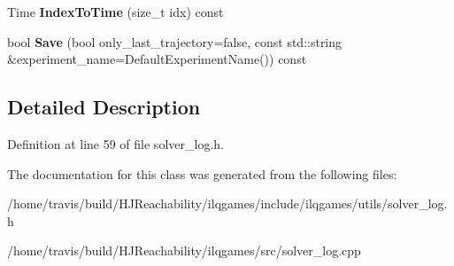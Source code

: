 \begin{DoxyCompactItemize}
\item 
Time {\bfseries Index\+To\+Time} (size\+\_\+t idx) const \hypertarget{classilqgames_1_1_solver_log_a5ab947d807b26ae2f10663e34af24f23}{}\label{classilqgames_1_1_solver_log_a5ab947d807b26ae2f10663e34af24f23}

\item 
bool {\bfseries Save} (bool only\+\_\+last\+\_\+trajectory=false, const std\+::string \&experiment\+\_\+name=Default\+Experiment\+Name()) const \hypertarget{classilqgames_1_1_solver_log_a28367e891af240b563417a8bd6c8127e}{}\label{classilqgames_1_1_solver_log_a28367e891af240b563417a8bd6c8127e}

\end{DoxyCompactItemize}


\subsection{Detailed Description}


Definition at line 59 of file solver\+\_\+log.\+h.



The documentation for this class was generated from the following files\+:\begin{DoxyCompactItemize}
\item 
/home/travis/build/\+H\+J\+Reachability/ilqgames/include/ilqgames/utils/solver\+\_\+log.\+h\item 
/home/travis/build/\+H\+J\+Reachability/ilqgames/src/solver\+\_\+log.\+cpp\end{DoxyCompactItemize}
